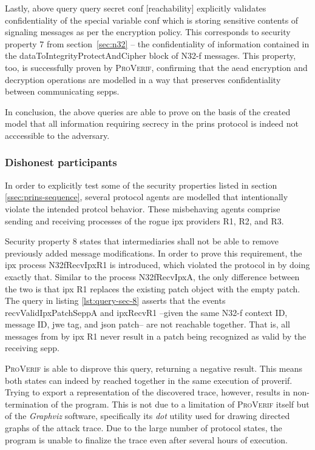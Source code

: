 Lastly, above query {\sffamily query secret conf [reachability]} explicitly validates confidentiality of the special variable {\sffamily conf} which is storing sensitive contents of signaling messages as per the encryption policy.
This corresponds to security property 7 from section~\ref{sec:n32} -- the confidentiality of information contained in the {\sffamily dataToIntegrityProtectAndCipher} block of N32-f messages.
This property, too, is successfully proven by \textsc{ProVerif}, confirming that the \gls{aead} encryption and decryption operations are modelled in a way that preserves confidentiality between communicating \glspl{sepp}.

In conclusion, the above queries are able to prove on the basis of the created model that all information requiring secrecy in the \gls{prins} protocol is indeed not acccessible to the adversary.

\subsubsection{Dishonest participants}

In order to explicitly test some of the security properties listed in section \ref{ssec:prins-sequence}, several protocol agents are modelled that intentionally violate the intended protcol behavior.
These misbehaving agents comprise sending and receiving processes of the rogue \gls{ipx} providers R1, R2, and R3.

Security property 8 states that intermediaries shall not be able to remove previously added message modifications.
In order to prove this requirement, the \gls{ipx} process {\sffamily N32fRecvIpxR1} is introduced, which violated the protocol in by doing exactly that.
Similar to the process {\sffamily N32fRecvIpxA}, the only difference between the two is that \gls{ipx} R1 replaces the existing patch object with the empty patch.
The query in listing \ref{lst:query-sec-8} asserts that the events {\sffamily recvValidIpxPatchSeppA} and {\sffamily ipxRecvR1} --given the same N32-f context ID, message ID, \gls{jwe} tag, and \gls{json} patch-- are not reachable together.
That is, all messages from by \gls{ipx} R1 never result in a patch being recognized as valid by the receiving \gls{sepp}.

\textsc{ProVerif} is able to disprove this query, returning a negative result.
This means both states can indeed by reached together in the same execution of proverif.
Trying to export a representation of the discovered trace, however, results in non-termination of the program.
This is not due to a limitation of \textsc{ProVerif} itself but of the \textit{Graphviz} software, specifically its \textit{dot} utility used for drawing directed graphs of the attack trace.
Due to the large number of protocol states, the program is unable to finalize the trace even after several hours of execution.

